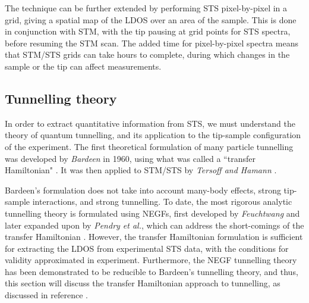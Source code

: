 The technique can be further extended by performing \ac{STS} pixel-by-pixel in a grid, giving a spatial map of the \ac{LDOS} over an area of the sample. This is done in conjunction with \ac{STM}, with the tip pausing at grid points for \ac{STS} spectra, before resuming the \ac{STM} scan. The added time for pixel-by-pixel spectra means that \ac{STM}/\ac{STS} grids can take hours to complete, during which changes in the sample or the tip can affect measurements. 


\subsection{Tunnelling theory}
In order to extract quantitative information from \ac{STS}, we must understand the theory of quantum tunnelling, and its application to the tip-sample configuration of the experiment. The first theoretical formulation of many particle tunnelling was developed by \textit{Bardeen} in 1960, using what was called a ``transfer Hamiltonian" \citep{PhysRevLett.6.57}. It was then applied to \ac{STM}/\ac{STS} by \textit{Tersoff and Hamann} \citep{0957-4484-17-8-R01,tersoff1985theory}. 

Bardeen's formulation does not take into account many-body effects, strong tip-sample interactions, and strong tunnelling. To date, the most rigorous analytic tunnelling theory is formulated using \acp{NEGF}, first developed by \textit{Feuchtwang} and later expanded upon by \textit{Pendry et al.}, which can address the short-comings of the transfer Hamiltonian \citep{feuchtwang1974tunneling, pendry1991theory}. However, the transfer Hamiltonian formulation is sufficient for extracting the \ac{LDOS} from experimental \ac{STS} data, with the conditions for validity approximated in experiment. Furthermore, the \ac{NEGF} tunnelling theory has been demonstrated to be reducible to Bardeen's tunnelling theory, and thus, this section will discuss the transfer Hamiltonian approach to tunnelling, as discussed in reference \citep{0957-4484-17-8-R01}.

